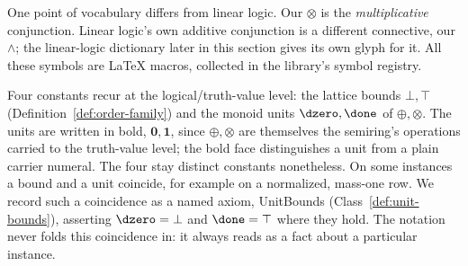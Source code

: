 One point of vocabulary differs from linear logic. Our $\otimes$ is the
\emph{multiplicative} conjunction. Linear logic's own additive
conjunction is a different connective, our $\wedge$; the linear-logic
dictionary later in this section gives its own glyph for it. All these
symbols are LaTeX macros, collected in the library's symbol registry.

Four constants recur at the logical/truth-value level: the lattice
bounds $\bot,\top$ (Definition~\ref{def:order-family}) and the monoid
units $\dzero,\done$ of $\oplus,\otimes$. The units are written in
bold, $\mathbf{0},\mathbf{1}$, since $\oplus,\otimes$ are themselves the
semiring's operations carried to the truth-value level; the bold face
distinguishes a unit from a plain carrier numeral. The four stay
distinct constants nonetheless. On some instances a bound and a unit
coincide, for example on a normalized, mass-one row. We record such a
coincidence as a named axiom, UnitBounds (Class~\ref{def:unit-bounds}),
asserting $\dzero=\bot$ and $\done=\top$ where they hold. The notation
never folds this coincidence in: it always reads as a fact about a
particular instance.

